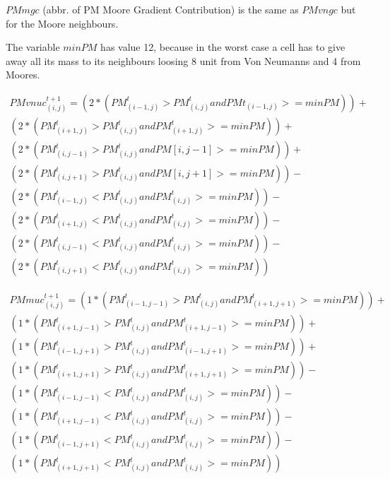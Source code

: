 $PMmgc$ (abbr. of PM Moore Gradient Contribution) is the same as $PMvngc$ but for the Moore neighbours.

The variable $minPM$ has value 12, because in the worst case a cell has to give away all its mass to its neighbours loosing 8 unit from Von Neumanns and 4 from Moores.

\begin{equation}
\begin{split}
PMvnuc^{t+1}_{(i, j)} = 
(2* (PM^t_{(i-1, j)} > PM^t_{(i, j)} and PMt_{(i-1, j)} >= minPM)) +
\\(2* (PM^t_{(i+1, j)} > PM^t_{(i, j)} and PM^t_{(i+1, j)} >= minPM)) +
\\(2* (PM^t_{(i, j-1)} > PM^t_{(i, j)} and PM[i, j-1] >= minPM)) +
\\(2* (PM^t_{(i, j+1)} > PM^t_{(i, j)} and PM[i, j+1] >= minPM)) -
\\(2*(PM^t_{(i-1, j)} < PM^t_{(i, j)} and PM^t_{(i, j)}>= minPM)) -
\\(2*(PM^t_{(i+1, j)} < PM^t_{(i, j)} and PM^t_{(i, j)} >= minPM)) -
\\(2*(PM^t_{(i, j-1)} < PM^t_{(i, j)} and PM^t_{(i, j)} >= minPM)) -
\\(2*(PM^t_{(i, j+1)} < PM^t_{(i, j)} and PM^t_{(i, j)} >= minPM))
\end{split}
\end{equation}

\begin{equation}
\begin{split}
PMmuc^{t+1}_{(i, j)} = 
(1* (PM^t_{(i-1, j-1)} > PM^t_{(i, j)} and PM^t_{(i+1, j+1)} >= minPM)) +
\\(1* (PM^t_{(i+1, j-1)} > PM^t_{(i, j)} and PM^t_{(i+1, j-1)} >= minPM)) +
\\(1* (PM^t_{(i-1, j+1)} > PM^t_{(i, j)} and PM^t_{(i-1, j+1)}>= minPM)) +
\\(1* (PM^t_{(i+1, j+1)} > PM^t_{(i, j)} and PM^t_{(i+1, j+1)} >= minPM)) -
\\(1*(PM^t_{(i-1, j-1)} < PM^t_{(i, j)} and PM^t_{(i, j)} >= minPM)) -
\\(1*(PM^t_{(i+1, j-1)} < PM^t_{(i, j)} and PM^t_{(i, j)} >= minPM)) -
\\(1*(PM^t_{(i-1, j+1)} < PM^t_{(i, j)} and PM^t_{(i, j)} >= minPM)) -
\\(1*(PM^t_{(i+1, j+1)} < PM^t_{(i, j)} and PM^t_{(i, j)} >= minPM))
\end{split}
\end{equation}

